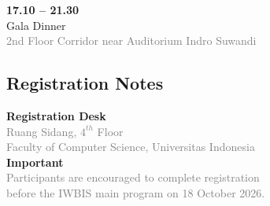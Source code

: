 \documentclass[10pt,a4paper]{article}
\begin{document}
\begin{minipage}[t]{0.48\textwidth}
\textbf{17.10 -- 21.30}\\
Gala Dinner\\
\textcolor{gray}{2nd Floor Corridor near Auditorium Indro Suwandi}

\vspace{15.8em}

\subsection*{Registration Notes}

\textbf{Registration Desk}\\
\textcolor{gray}{Ruang Sidang, $4^{th}$ Floor\\
Faculty of Computer Science, Universitas Indonesia}\\[0.5em]

\textbf{Important}\\
\textcolor{gray}{Participants are encouraged to complete registration}\\
\textcolor{gray}{before the IWBIS main program on 18 October 2026.}

\end{minipage}%
\hfill
\end{document}
